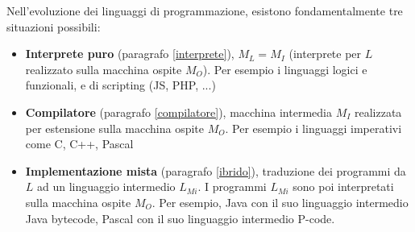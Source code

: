 \documentclass[a4paper]{article}
\begin{document}
	Nell'evoluzione dei linguaggi di programmazione, esistono fondamentalmente tre situazioni possibili:
	\begin{itemize}
		\item \textcolor{Red3}{\textbf{Interprete puro}} (paragrafo \ref{interprete}), $M_{L} = M_{I}$ (interprete per $L$ realizzato sulla macchina ospite $M_{O}$). Per esempio i linguaggi logici e funzionali, e di scripting (JS, PHP, ...)

		\item \textcolor{Red3}{\textbf{Compilatore}} (paragrafo \ref{compilatore}), macchina intermedia $M_{I}$ realizzata per estensione sulla macchina ospite $M_{O}$. Per esempio i linguaggi imperativi come C, C++, Pascal
		
		\item \textcolor{Red3}{\textbf{Implementazione mista}} (paragrafo \ref{ibrido}), traduzione dei programmi da $L$ ad un linguaggio intermedio $L_{Mi}$. I programmi $L_{Mi}$ sono poi interpretati sulla macchina ospite $M_{O}$. Per esempio, Java con il suo linguaggio intermedio Java bytecode, Pascal con il suo linguaggio intermedio P-code.
	\end{itemize}
\end{document}
